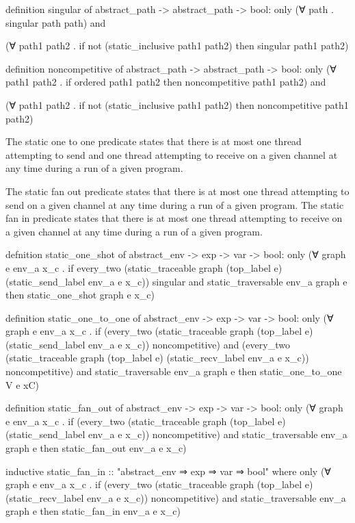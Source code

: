 definition singular of abstract_path -> abstract_path -> bool:
only
(∀ path .
  singular path path) and

(∀ path1 path2 .
  if
    not (static_inclusive path1 path2)
  then
    singular path1 path2)

definition noncompetitive of abstract_path -> abstract_path -> bool:
only
(∀ path1 path2 .
  if
    ordered path1 path2
  then
    noncompetitive path1 path2) and

(∀ path1 path2 .
  if
    not (static_inclusive path1 path2)
  then
    noncompetitive path1 path2)


The static one to one predicate states that there is at most one thread attempting to send and
one thread attempting to receive on a given channel at any time during a run of a given
program.

The static fan out predicate states that there is at most one thread attempting to send on a
given channel at any time during a run of a given program. The static fan in predicate states
that there is at most one thread attempting to receive on a given channel at any time during a
run of a given program. 


defnition static_one_shot of abstract_env -> exp -> var -> bool:
only
(∀ graph e env_a x_c .
  if
    every_two (static_traceable graph (top_label e) (static_send_label env_a e x_c)) singular and
    static_traversable env_a graph e
  then
    static_one_shot graph e x_c)

definition static_one_to_one of abstract_env -> exp -> var -> bool:
only
(∀ graph e env_a x_c .
  if
    (every_two
      (static_traceable graph (top_label e) (static_send_label env_a e x_c))
      noncompetitive) and 
    (every_two
      (static_traceable graph (top_label e) (static_recv_label env_a e x_c))
      noncompetitive) and 
    static_traversable env_a graph e
  then
    static_one_to_one V e xC)

definition static_fan_out of abstract_env -> exp -> var -> bool:
only
(∀ graph e env_a x_c .
  if
    (every_two
      (static_traceable graph (top_label e) (static_send_label env_a e x_c))
      noncompetitive) and
    static_traversable env_a graph e
  then
    static_fan_out env_a e x_c) 

inductive static_fan_in :: "abstract_env ⇒ exp ⇒ var ⇒ bool" where
only
(∀ graph e env_a x_c .
  if
    (every_two
      (static_traceable graph (top_label e) (static_recv_label env_a e x_c))
      noncompetitive) and
    static_traversable env_a graph e
  then
    static_fan_in env_a e x_c) 

